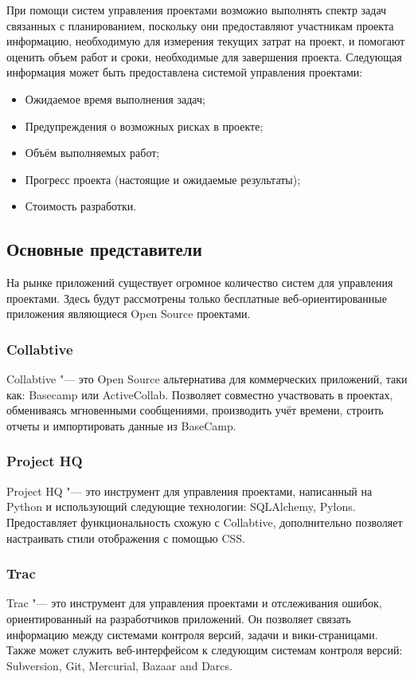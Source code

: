 При помощи систем управления проектами возможно выполнять спектр задач
связанных с планированием, поскольку они предоставляют участникам проекта
информацию, необходимую для измерения текущих затрат на проект, и помогают
оценить объем работ и сроки, необходимые для завершения проекта. Следующая
информация может быть предоставлена системой управления проектами:
\begin{itemize}
  \item Ожидаемое время выполнения задач;
  \item Предупреждения о возможных рисках в проекте;
  \item Объём выполняемых работ;
  \item Прогресс проекта (настоящие и ожидаемые результаты);
  \item Стоимость разработки.
\end{itemize}


\subsection{Основные представители}
На рынке приложений существует огромное количество систем для управления
проектами. Здесь будут рассмотрены только бесплатные веб-ориентированные
приложения являющиеся Open Source проектами.

\subsubsection{Collabtive}
Collabtive "--- это Open Source альтернатива для коммерческих приложений, таки
как: Basecamp или ActiveCollab. Позволяет совместно участвовать в
проектах, обмениваясь мгновенными сообщениями, производить учёт времени,
строить отчеты и импортировать данные из BaseCamp.

\subsubsection{Project HQ}
Project HQ "--- это инструмент для управления проектами, написанный на Python и
использующий следующие технологии: SQLAlchemy, Pylons. Предоставляет
функциональность схожую с Collabtive, дополнительно позволяет настраивать стили
отображения с помощью CSS.

\subsubsection{Trac}
Trac "--- это инструмент для управления проектами и отслеживания ошибок,
ориентированный на разработчиков приложений. Он позволяет связать информацию
между системами контроля версий, задачи и вики-страницами. Также может служить
веб-интерфейсом к следующим системам контроля версий: Subversion, Git,
Mercurial, Bazaar and Darcs.

